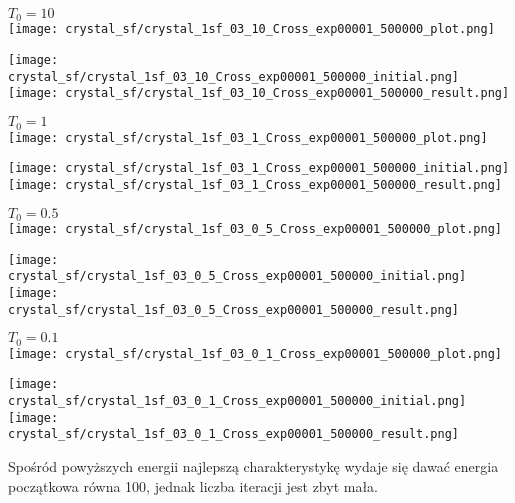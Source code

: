 \begin{minipage}{\textwidth}
\begin{minipage}{.7\linewidth}
$T_0=10$\\
  \texttt{[image: crystal\_sf/crystal\_1sf\_03\_10\_Cross\_exp00001\_500000\_plot.png]}
\end{minipage}%
\begin{minipage}{.3\linewidth}
  \texttt{[image: crystal\_sf/crystal\_1sf\_03\_10\_Cross\_exp00001\_500000\_initial.png]}
  \texttt{[image: crystal\_sf/crystal\_1sf\_03\_10\_Cross\_exp00001\_500000\_result.png]}
\end{minipage}
\end{minipage}

\begin{minipage}{\textwidth}
\begin{minipage}{.7\linewidth}
$T_0=1$\\
  \texttt{[image: crystal\_sf/crystal\_1sf\_03\_1\_Cross\_exp00001\_500000\_plot.png]}
\end{minipage}%
\begin{minipage}{.3\linewidth}
  \texttt{[image: crystal\_sf/crystal\_1sf\_03\_1\_Cross\_exp00001\_500000\_initial.png]}
  \texttt{[image: crystal\_sf/crystal\_1sf\_03\_1\_Cross\_exp00001\_500000\_result.png]}
\end{minipage}
\end{minipage}

\begin{minipage}{\textwidth}
\begin{minipage}{.7\linewidth}
$T_0=0.5$\\
  \texttt{[image: crystal\_sf/crystal\_1sf\_03\_0\_5\_Cross\_exp00001\_500000\_plot.png]}
\end{minipage}%
\begin{minipage}{.3\linewidth}
  \texttt{[image: crystal\_sf/crystal\_1sf\_03\_0\_5\_Cross\_exp00001\_500000\_initial.png]}
  \texttt{[image: crystal\_sf/crystal\_1sf\_03\_0\_5\_Cross\_exp00001\_500000\_result.png]}
\end{minipage}
\end{minipage}

\begin{minipage}{\textwidth}
\begin{minipage}{.7\linewidth}
$T_0=0.1$\\
  \texttt{[image: crystal\_sf/crystal\_1sf\_03\_0\_1\_Cross\_exp00001\_500000\_plot.png]}
\end{minipage}%
\begin{minipage}{.3\linewidth}
  \texttt{[image: crystal\_sf/crystal\_1sf\_03\_0\_1\_Cross\_exp00001\_500000\_initial.png]}
  \texttt{[image: crystal\_sf/crystal\_1sf\_03\_0\_1\_Cross\_exp00001\_500000\_result.png]}
\end{minipage}
\end{minipage}
Spośród powyższych energii najlepszą charakterystykę wydaje się dawać energia początkowa równa 100, jednak liczba iteracji jest zbyt mała.